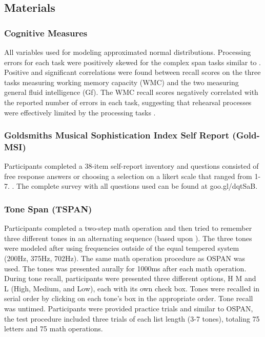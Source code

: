 \documentclass[12pt,]{book}
\begin{document}
\hypertarget{materials}{%
\subsection{Materials}\label{materials}}

\hypertarget{cognitive-measures}{%
\subsubsection{Cognitive Measures}\label{cognitive-measures}}

All variables used for modeling approximated normal distributions.
Processing errors for each task were positively skewed for the complex span tasks similar to \citet{unsworthComplexWorkingMemory2009}.
Positive and significant correlations were found between recall scores on the three tasks measuring working memory capacity (WMC) and the two measuring general fluid intelligence (Gf).
The WMC recall scores negatively correlated with the reported number of errors in each task, suggesting that rehearsal processes were effectively limited by the processing tasks \citep{unsworthComplexWorkingMemory2009}.

\hypertarget{goldsmiths-musical-sophistication-index-self-report-gold-msi}{%
\subsubsection{Goldsmiths Musical Sophistication Index Self Report (Gold-MSI)}\label{goldsmiths-musical-sophistication-index-self-report-gold-msi}}

Participants completed a 38-item self-report inventory and questions consisted of free response answers or choosing a
selection on a likert scale that ranged from 1-7. \citep{mullensiefenMusicalityNonMusiciansIndex2014}.
The complete survey with all questions used can be found at goo.gl/dqtSaB.

\hypertarget{tone-span-tspan}{%
\subsubsection{Tone Span (TSPAN)}\label{tone-span-tspan}}

Participants completed a two-step math operation and then tried to remember three different tones in an alternating sequence (based upon \citet{unsworthAutomatedVersionOperation2005}).
The three tones were modeled after \citet{liEstimatingWorkingMemory2013} using frequencies outside of the equal tempered system (200Hz, 375Hz, 702Hz).
The same math operation procedure as OSPAN was used.
The tones was presented aurally for 1000ms after each math operation.
During tone recall, participants were presented three different options, H M and L (High, Medium, and Low), each with its own check box.
Tones were recalled in serial order by clicking on each tone's box in the appropriate order.
Tone recall was untimed.
Participants were provided practice trials and similar to OSPAN, the test procedure included three trials of each list length (3-7 tones), totaling 75 letters and 75 math operations.
\end{document}

